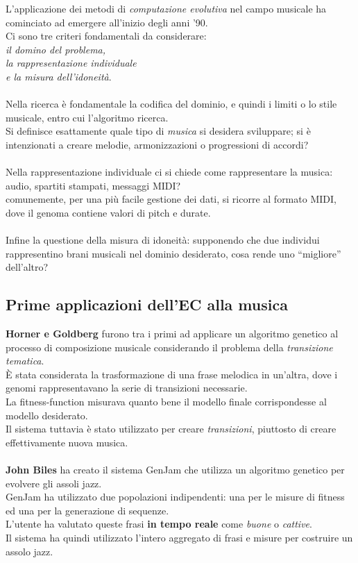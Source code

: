 \documentclass[a4paper,12pt]{report}
\begin{document}
L'applicazione dei metodi di \textit{computazione evolutiva} nel campo musicale ha cominciato ad emergere all'inizio degli anni '90. \\
Ci sono tre criteri fondamentali da considerare: \\
\textit{il domino del problema,} \\
\textit{la rappresentazione individuale} \\
\textit{e la misura dell'idoneità}. \\
\\
Nella ricerca è fondamentale la codifica del dominio, e quindi i limiti o lo stile musicale, entro cui l'algoritmo ricerca. \\
Si definisce esattamente quale tipo di \textit{musica} si desidera sviluppare; si è intenzionati a creare melodie, armonizzazioni o progressioni di accordi? \\
\\
Nella rappresentazione individuale ci si chiede come rappresentare la musica: audio, spartiti stampati, messaggi MIDI? \\
comunemente, per una più facile gestione dei dati, si ricorre al formato MIDI, dove il genoma contiene valori di pitch e durate. \\
\\
Infine la questione della misura di idoneità: supponendo che due individui rappresentino brani musicali nel dominio desiderato, cosa rende uno “migliore” dell’altro? 

\subsection{Prime applicazioni dell'EC alla musica}

\textbf{Horner e Goldberg} furono tra i primi ad applicare un algoritmo genetico al processo di composizione musicale considerando il problema della \textit{transizione tematica}. \\
È stata considerata la trasformazione di una frase melodica in un'altra, dove i genomi rappresentavano la serie di transizioni necessarie.  \\
La fitness-function misurava quanto bene il modello finale corrispondesse al modello desiderato. \\
Il sistema tuttavia è stato utilizzato per creare \textit{transizioni}, piuttosto di creare effettivamente nuova musica. \\
\\
\textbf{John Biles} ha creato il sistema GenJam che utilizza un algoritmo genetico per evolvere gli assoli jazz. \\
GenJam ha utilizzato due popolazioni indipendenti: una per le misure di fitness ed una per la generazione di sequenze. \\
L’utente ha valutato queste frasi \textbf{in tempo reale} come \textit{buone} o \textit{cattive}. \\
Il sistema ha quindi utilizzato l'intero aggregato di frasi e misure per costruire un assolo jazz.
\end{document}
